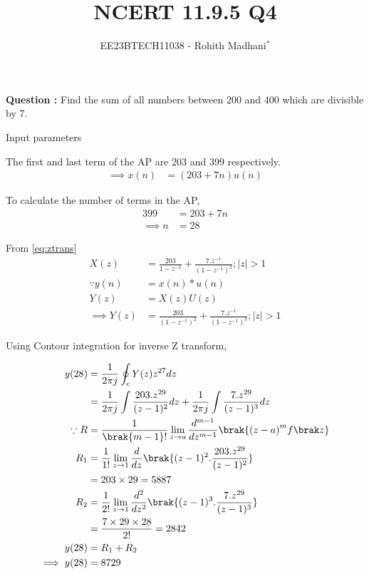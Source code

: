 \documentclass[journal,12pt,twocolumn]{IEEEtran}
\theoremstyle{remark}
\begin{document}

\vspace{3cm}

\title{NCERT 11.9.5 Q4}
\author{EE23BTECH11038 - Rohith Madhani$^{*}$%
}
\maketitle
\newpage
\bigskip
\renewcommand{\thefigure}{\theenumi}
\renewcommand{\thetable}{\theenumi}

\textbf{Question :} Find the sum of all numbers between 200 and 400 which are divisible by 7.\\
\solution 
\fi

\begin{table}[!h] 
\centering

\caption{Input parameters}
\label{table:11.9.5.4}
\end{table}

The first and last term of the AP are 203 and 399 respectively.
\begin{align}
    \implies x(n) &= (203 + 7n)u(n) 
\end{align}

To calculate the number of terms in the AP,
\begin{align}
    399 &= 203 + 7n \\
    \implies n &= 28
\end{align}

From \eqref{eq:ztrans}
\begin{align}
    X(z) &= \frac{203}{1-z^{-1}} + \frac{7.z^{-1}}{(1-z^{-1})^2} ; |z|>1 \\
    \because y(n) &= x(n)*u(n) \\
    Y(z) &= X(z)U(z) \\
    \implies Y(z) &= \frac{203}{(1-z^{-1})^2} + \frac{7.z^{-1}}{(1-z^{-1})^3} ; |z|>1 
\end{align}

Using Contour integration for inverse Z transform,

\begin{align}
    y(28) &= \frac{1}{2\pi j}\oint_c Y(z) z^{27} dz \\
    &= \frac{1}{2\pi j}\int \frac{203.z^{29}}{(z-1)^{2}} dz + \frac{1}{2\pi j}\int \frac{7.z^{29}}{(z-1)^{3}} dz\\
    \because R&=\frac{1}{\brak {m-1}!}\lim\limits_{z\to a}\frac{d^{m-1}}{dz^{m-1}}\brak {{(z-a)}^{m}f\brak z}\\
    R_1 &=\frac{1}{1!}\lim\limits_{z\to 1}\frac{d}{dz}\brak {(z-1)^2.\frac{203.z^{29}}{(z-1)^{2}}}\\
    &= 203 \times 29 = 5887 \\
    R_2 &=\frac{1}{2!}\lim\limits_{z\to 1}\frac{d^2}{dz^2}\brak {(z-1)^3.\frac{7.z^{29}}{(z-1)^{3}}}\\
    &= \frac{7 \times 29 \times 28}{2!} = 2842\\
    y(28) &= R_1 + R_2 \\
    \implies y(28) &= 8729 
\end{align}
\end{document}
